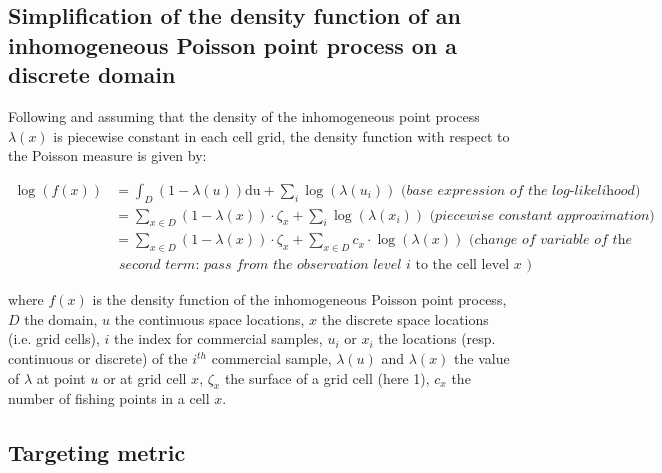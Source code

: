 \begin{center}
\begin{longtable}{ll}
\end{longtable}
\end{center}

\clearpage

\subsection{Simplification of the density function of an inhomogeneous Poisson point process on a discrete domain}\label{appendix:IPPsimp}

Following \textcite{diggle-statistical-2013} and assuming that the density of the inhomogeneous point process \(\lambda(x)\) is piecewise constant in each cell grid, the density function with respect to the Poisson measure is given by:

\begin{equation*}
\begin{aligned}
\log (f(x)) &=\int_{D}(1-\lambda(u)) \mathrm{du}+\sum_{i} \log \left(\lambda\left(u_{i}\right)\right) \textit { (base expression of the log-likelihood) } \\
&=\sum_{x \in D}(1-\lambda(x)) \cdot \zeta_{x}+\sum_{i} \log \left(\lambda\left(x_{i}\right)\right) \textit { (piecewise constant approximation) } \\
&=\sum_{x \in D}(1-\lambda(x)) \cdot \zeta_{x}+\sum_{x \in D} c_{x} \cdot \log (\lambda(x)) \textit { (change of variable of the } \\
& \textit { second term: pass from the observation level } i \text { to the cell level } x \text { ) }
\end{aligned}
\end{equation*}

where \(f(x)\) is the density function of the inhomogeneous Poisson point process, \(D\) the domain, \(u\) the continuous space locations, \(x\) the discrete space locations (i.e. grid cells), \(i\) the index for commercial samples, \(u_{i}\) or \(x_i\) the locations (resp. continuous or discrete) of the \(i^{th}\) commercial sample, \(\lambda(u)\) and \(\lambda(x)\) the value of \(\lambda\) at point \(u\) or at grid cell \(x\), \(\zeta_x\) the surface of a grid cell (here 1), \(c_x\) the number of fishing points in a cell \(x\).

\clearpage

\subsection{Targeting metric}\label{appendix:TargM}

